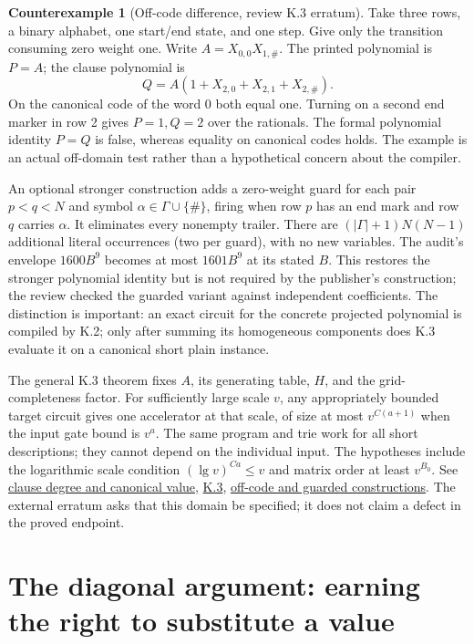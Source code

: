 \documentclass[11pt,letterpaper]{article}
\theoremstyle{definition}\newtheorem{definition}[theorem]{Definition}\newtheorem{example}[theorem]{Example}
\newtheorem{counterexample}[theorem]{Counterexample}
\theoremstyle{remark}\newtheorem{remark}[theorem]{Remark}
\newcommand{\pub}[3]{\href{https://github.com/anthropics/formal-math/blob/11b6c7e3c927df2658f513b6b68ea7f8929c62c5/vp-vnp/#1\#L#2}{#3}}
\newcommand{\aud}[2]{\href{https://github.com/nousentllc/VP-VNP-Review/blob/567303d0bcf4f9d54390437b137752446e58ccd6/#1}{#2}}
\begin{document}
\begin{counterexample}[Off-code difference, review K.3 erratum]\label{ex:k3}
Take three rows, a binary alphabet, one start/end state, and one step. Give only the transition consuming zero weight one. Write $A=X_{0,0}X_{1,\#}$. The printed polynomial is $P=A$; the clause polynomial is
\[
 Q=A(1+X_{2,0}+X_{2,1}+X_{2,\#}).
\]
On the canonical code of the word 0 both equal one. Turning on a second end marker in row 2 gives $P=1,Q=2$ over the rationals. The formal polynomial identity $P=Q$ is false, whereas equality on canonical codes holds. The example is an actual off-domain test rather than a hypothetical concern about the compiler.
\end{counterexample}
An optional stronger construction adds a zero-weight guard for each pair $p<q<N$ and symbol $\alpha\in\Gamma\cup\{\#\}$, firing when row $p$ has an end mark and row $q$ carries $\alpha$. It eliminates every nonempty trailer. There are $(|\Gamma|+1)N(N-1)$ additional literal occurrences (two per guard), with no new variables. The audit's envelope $1600B^9$ becomes at most $1601B^9$ at its stated $B$. This restores the stronger polynomial identity but is not required by the publisher's construction; the review checked the guarded variant against independent coefficients. The distinction is important: an exact circuit for the concrete projected polynomial is compiled by K.2; only after summing its homogeneous components does K.3 evaluate it on a canonical short plain instance.

The general K.3 theorem fixes $A$, its generating table, $H$, and the grid-completeness factor. For sufficiently large scale $v$, any appropriately bounded target circuit gives one accelerator at that scale, of size at most $v^{C(a+1)}$ when the input gate bound is $v^a$. The same program and trie work for all short descriptions; they cannot depend on the individual input. The hypotheses include the logarithmic scale condition $(\lg v)^{Ca}\le v$ and matrix order at least $v^{B_0}$. See \pub{Paper/CircuitPhi.lean}{175}{clause degree and canonical value}, \pub{Paper/Circuit.lean}{294}{K.3}, \aud{passes/14c-compiler.md}{off-code and guarded constructions}. The external erratum asks that this domain be specified; it does not claim a defect in the proved endpoint.

\section{The diagonal argument: earning the right to substitute a value}\label{sec:diagonal}
\end{document}
